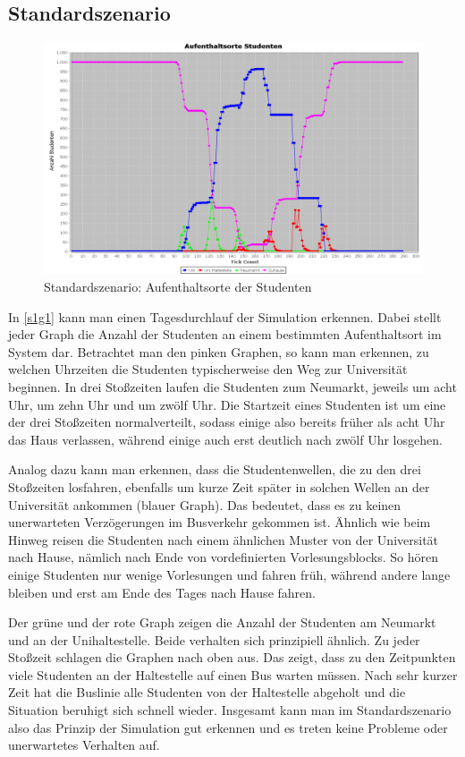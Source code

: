 \documentclass[12pt,a4paper]{scrartcl}
\begin{document}
\subsection{Standardszenario}\label{s1}
\begin{figure}
\includegraphics[scale=0.4]{Standardszenario_Aufenthaltsorte.png}
\caption{Standardszenario: Aufenthaltsorte der Studenten}
\label{s1g1}
\end{figure}

In \autoref{s1g1} kann man einen Tagesdurchlauf der Simulation erkennen. Dabei stellt jeder Graph die Anzahl der Studenten an einem bestimmten Aufenthaltsort im System dar. Betrachtet man den pinken Graphen, so kann man erkennen, zu welchen Uhrzeiten die Studenten typischerweise den Weg zur Universität beginnen. In drei Stoßzeiten laufen die Studenten zum Neumarkt, jeweils um acht Uhr, um zehn Uhr und um zwölf Uhr. Die Startzeit eines Studenten ist um eine der drei Stoßzeiten normalverteilt, sodass einige also bereits früher als acht Uhr das Haus verlassen, während einige auch erst deutlich nach zwölf Uhr losgehen. 

Analog dazu kann man erkennen, dass die Studentenwellen, die zu den drei Stoßzeiten losfahren, ebenfalls um kurze Zeit später in solchen Wellen an der Universität ankommen (blauer Graph). Das bedeutet, dass es zu keinen unerwarteten Verzögerungen im Busverkehr gekommen ist. Ähnlich wie beim Hinweg reisen die Studenten nach einem ähnlichen Muster von der Universität nach Hause, nämlich nach Ende von vordefinierten Vorlesungsblocks. So hören einige Studenten nur wenige Vorlesungen und fahren früh, während andere lange bleiben und erst am Ende des Tages nach Hause fahren. 

Der grüne und der rote Graph zeigen die Anzahl der Studenten am Neumarkt und an der Unihaltestelle. Beide verhalten sich prinzipiell ähnlich. Zu jeder Stoßzeit schlagen die Graphen nach oben aus. Das zeigt, dass zu den Zeitpunkten viele Studenten an der Haltestelle auf einen Bus warten müssen. Nach sehr kurzer Zeit hat die Buslinie alle Studenten von der Haltestelle abgeholt und die Situation beruhigt sich schnell wieder.
Insgesamt kann man im Standardszenario also das Prinzip der Simulation gut erkennen und es treten keine Probleme oder unerwartetes Verhalten auf.
\end{document}

